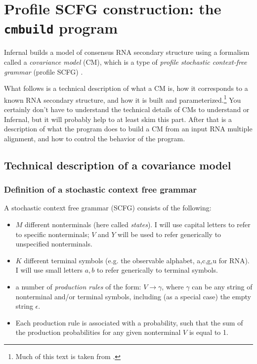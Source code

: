 \section{Profile SCFG construction: the \texttt{cmbuild} program}
\label{section:cmbuild}
\setcounter{footnote}{0}

Infernal builds a model of consensus RNA secondary
structure using a formalism called a \emph{covariance model} (CM),
which is a type of \emph{profile stochastic context-free grammar}
(profile SCFG) \citep{Eddy94,Durbin98,Eddy02b}.

What follows is a technical description of what a CM is, how it
corresponds to a known RNA secondary structure, and how it is built
and parameterized.\footnote{Much of this text is taken from
\citep{Eddy02b}.}  You certainly don't have to understand the technical
details of CMs to understand  or Infernal,
but it will probably help to at least skim this part. After that is a
description of what the  program does to build a CM from
an input RNA multiple alignment, and how to control the behavior of
the program.

\subsection{Technical description of a covariance model}

\subsubsection{Definition of a stochastic context free grammar}

A stochastic context free grammar (SCFG) consists of the following:

\begin{itemize}
\item $M$ different nonterminals (here called \emph{states}). I will use capital
      letters to refer to specific nonterminals; $V$ and $Y$ will be used
      to refer generically to unspecified nonterminals.
\item $K$ different terminal symbols (e.g. the observable alphabet,
      {a,c,g,u} for RNA). I will use small letters $a,b$ to refer
      generically to terminal symbols.
\item a number of \emph{production rules} of the form: $V \rightarrow
\gamma$, where $\gamma$ can be any string of nonterminal and/or
terminal symbols, including (as a special case) the empty string
$\epsilon$.
\item Each production rule is associated with a probability, such that
      the sum of the production probabilities for any given
      nonterminal $V$ is equal to 1.
\end{itemize} 

